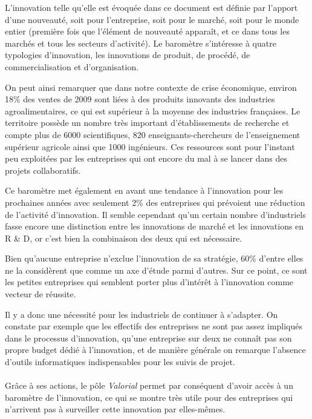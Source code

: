 \documentclass[a4paper,12pt]{report}
\begin{document}
    L’innovation telle qu’elle est évoquée dans ce document est définie par l’apport d’une nouveauté, soit pour l’entreprise, soit pour le marché, soit pour le monde entier (première fois que l’élément de nouveauté apparaît, et ce dans tous les marchés et tous les secteurs d’activité). Le baromètre s’intéresse à quatre typologies d’innovation, les innovations de produit, de procédé, de commercialisation et d’organisation.

    On peut ainsi remarquer que dans notre contexte de crise économique, environ 18\% des ventes de 2009 sont liées à des produits innovants des industries agroalimentaires, ce qui est supérieur à la moyenne des industries françaises. Le territoire possède un nombre très important d’établissements de recherche et compte plus de 6000 scientifiques, 820 enseignants-chercheurs de l’enseignement supérieur agricole ainsi que 1000 ingénieurs. Ces ressources sont pour l’instant peu exploitées par les entreprises qui ont encore du mal à se lancer dans des projets collaboratifs.

    Ce baromètre met également en avant une tendance à l’innovation pour les prochaines années avec seulement 2\% des entreprises qui prévoient une réduction de l’activité d’innovation. Il semble cependant qu’un certain nombre d'industriels fasse encore une distinction entre les innovations de marché et les innovations en R \& D, or c’est bien la combinaison des deux qui est nécessaire.

    Bien qu’aucune entreprise n’exclue l’innovation de sa stratégie, 60\% d'entre elles ne la considèrent que comme un axe d’étude parmi d’autres. Sur ce point, ce sont les petites entreprises qui semblent porter plus d’intérêt à l’innovation comme vecteur de réussite.

    Il y a donc une nécessité pour les industriels de continuer à s’adapter. On constate par exemple que les effectifs des entreprises ne sont pas assez impliqués dans le processus d’innovation, qu’une entreprise sur deux ne connaît pas son propre budget dédié à l’innovation, et de manière générale on remarque l’absence d’outils informatiques indispensables pour les suivis de projet.
    
    \paragraph{}Grâce à ses actions, le pôle \textit{Valorial} permet par conséquent d'avoir accès à un baromètre de l'innovation, ce qui se montre très utile pour des entreprises qui n'arrivent pas à surveiller cette innovation par elles-mêmes.
\end{document}
